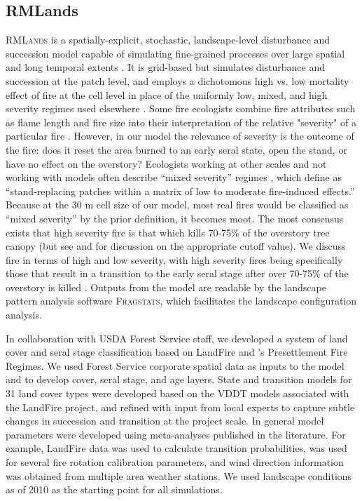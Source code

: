 \documentclass[12pt]{article}
\begin{document}
\begin{spacing}{1}
\subsection{RMLands}

\textsc{RMLands} is a spatially-explicit, stochastic, landscape-level disturbance and succession model capable of simulating fine-grained processes over large spatial and long temporal extents \citep{McGarigal2005}. It is grid-based but simulates disturbance and succession at the patch level, and employs a dichotomous high vs. low mortality effect of fire at the cell level in place of the uniformly low, mixed, and high severity regimes used elsewhere \citep{Mcgarigal2012}. Some fire ecologists combine fire attributes such as flame length and fire size into their interpretation of the relative "severity" of a particular fire \citep{Agee1993}. However, in our model the relevance of severity is the outcome of the fire: does it reset the area burned to an early seral state, open the stand, or have no effect on the overstory?  Ecologists working at other scales and not working with models often describe ``mixed severity'' regimes \citep[e.g.,]{Kane2013}, which \citet{Collins2010} define as ``stand-replacing patches within a matrix of low to moderate fire-induced effects.'' Because at the 30 m cell size of our model, most real fires would be classified as ``mixed severity'' by the prior definition, it becomes moot. The most consensus exists that high severity fire is that which kills 70-75\% of the overstory tree canopy (but see \citep{Fule2014} and \citep{Mallek2013} for discussion on the appropriate cutoff value). We discuss fire in terms of high and low severity, with high severity fires being specifically those that result in a transition to the early seral stage after over 70-75\% of the overstory is killed \citep{Miller2009, Baker2014}. Outputs from the model are readable by the landscape pattern analysis software \textsc{Fragstats}, which facilitates the landscape configuration analysis. 

In collaboration with USDA Forest Service staff, we developed a system of land cover and seral stage classification based on LandFire and \citet{VandeWater2011}'s Presettlement Fire Regimes. We used Forest Service corporate spatial data as inputs to the model and to develop cover, seral stage, and age layers. State and transition models for 31 land cover types were developed based on the VDDT models associated with the LandFire project, and refined with input from local experts to capture subtle changes in succession and transition at the project scale. In general model parameters were developed using meta-analyses published in the literature. For example, LandFire data was used to calculate transition probabilities, \citet{Mallek2013} was used for several fire rotation calibration parameters, and wind direction information was obtained from multiple area weather stations. We used landscape conditions as of 2010 as the starting point for all simulations. 


\end{spacing}
\end{document}
